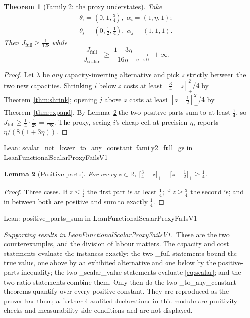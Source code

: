 \documentclass[conference]{IEEEtran}
\newtheorem{theorem}{Theorem}
\newtheorem{lemma}[theorem]{Lemma}
\theoremstyle{definition}
\newcommand{\lean}[1]{\textsf{\footnotesize #1}}
\newcommand{\leanbox}[1]{%
  \par\vspace{2pt}\noindent
  {\footnotesize\textsf{Lean: #1}}\par\vspace{2pt}}
\begin{document}
\begin{theorem}[Family 2: the proxy understates]
\label{thm:family2}
Take
\begin{align}
\theta_{i}=(0,1,\tfrac34),\;\alpha_{i}=(1,\eta,1);\\
\theta_{j}=(0,\tfrac12,\tfrac14),\;\alpha_{j}=(1,1,1).
\end{align}
Then $J_{\mathrm{full}}\ge\tfrac{1}{128}$ while
\begin{equation}
\frac{J_{\mathrm{full}}}{J_{\mathrm{scalar}}}
\;\geq\;\frac{1+3\eta}{16\eta}
\;\xrightarrow[\eta\to0]{}\;+\infty .
\label{eq:family2}
\end{equation}
\end{theorem}

\begin{proof}
Let $\lambda$ be \emph{any} capacity-inverting alternative and pick $z$ strictly between the
two new capacities. Shrinking $i$ below $z$ costs at least $[\tfrac34-z]_{+}^{2}/4$ by
Theorem~\ref{thm:shrink}; opening $j$ above $z$ costs at least $[z-\tfrac12]_{+}^{2}/4$ by
Theorem~\ref{thm:expand}. By Lemma~\ref{lem:posparts} the two positive parts sum to at least
$\tfrac14$, so $J_{\mathrm{full}}\ge\tfrac14\cdot\tfrac{1}{32}=\tfrac{1}{128}$. The proxy,
seeing $i$'s cheap cell at precision $\eta$, reports $\eta/(8(1+3\eta))$.
\end{proof}

\leanbox{\lean{scalar\_not\_lower\_to\_any\_constant}, \lean{family2\_full\_ge} in
\lean{LeanFunctionalScalarProxyFailsV1}}

\begin{lemma}[Positive parts]
\label{lem:posparts}
For every $z\in\mathbb{R}$,
$\bigl[\tfrac34-z\bigr]_{+}+\bigl[z-\tfrac12\bigr]_{+}\ge\tfrac14$.
\end{lemma}

\begin{proof}
Three cases. If $z\le\tfrac12$ the first part is at least $\tfrac14$; if $z\ge\tfrac34$ the
second is; and in between both are positive and sum to exactly $\tfrac14$.
\end{proof}

\leanbox{\lean{positive\_parts\_sum} in \lean{LeanFunctionalScalarProxyFailsV1}}

\noindent\emph{Supporting results in \lean{LeanFunctionalScalarProxyFailsV1}.}~These are the two counterexamples, and the division of labour matters. The capacity and cost statements evaluate the instances exactly; the two \lean{\_full} statements bound the true value, one above by an exhibited alternative and one below by the positive-parts inequality; the two \lean{\_scalar\_value} statements evaluate \eqref{eq:scalar}; and the two ratio statements combine them. Only then do the two \lean{\_to\_any\_constant} theorems quantify over every positive constant. They are reproduced as the prover has them; a further $4$ audited declarations in this module are positivity checks and measurability side conditions and are not displayed.
\end{document}
